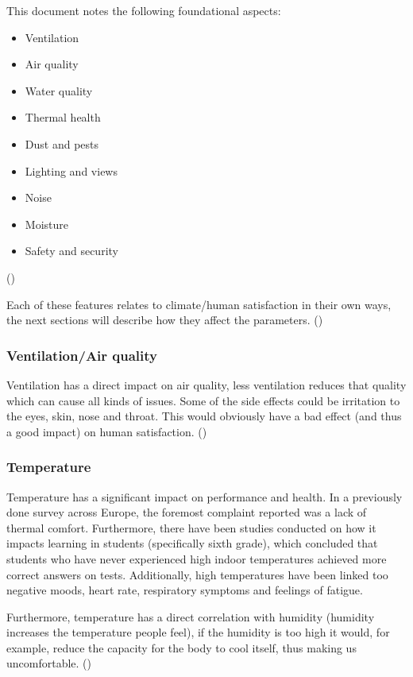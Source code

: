 \documentclass[12pt,a4paper]{article}
\begin{document}
This document notes the following foundational aspects:
\begin{itemize}
	\item Ventilation
	\item Air quality
	\item Water quality
	\item Thermal health
	\item Dust and pests
	\item Lighting and views
	\item Noise
	\item Moisture
	\item Safety and security
\end{itemize}
(\cite{9foundations})

Each of these features relates to climate/human satisfaction in their own ways, the next sections will describe how they affect the parameters.
(\cite{9foundations})

\subsubsection{Ventilation/Air quality}
Ventilation has a direct impact on air quality, less ventilation reduces that quality which can cause all kinds of issues. Some of the side effects could be irritation to the eyes, skin, nose and throat. This would obviously have a bad effect (and thus a good impact) on human satisfaction. 
(\cite{9foundations})

\subsubsection{Temperature}
Temperature has a significant impact on performance and health. In a previously done survey across Europe, the foremost complaint reported was a lack of thermal comfort. Furthermore, there have been studies conducted on how it impacts learning in students (specifically sixth grade), which concluded that students who have never experienced high indoor temperatures achieved more correct answers on tests. Additionally, high temperatures have been linked too negative moods, heart rate, respiratory symptoms and feelings of fatigue.

Furthermore, temperature has a direct correlation with humidity (humidity increases the temperature people feel), if the humidity is too high it would, for example, reduce the capacity for the body to cool itself, thus making us uncomfortable.
(\cite{9foundations})
\end{document}
